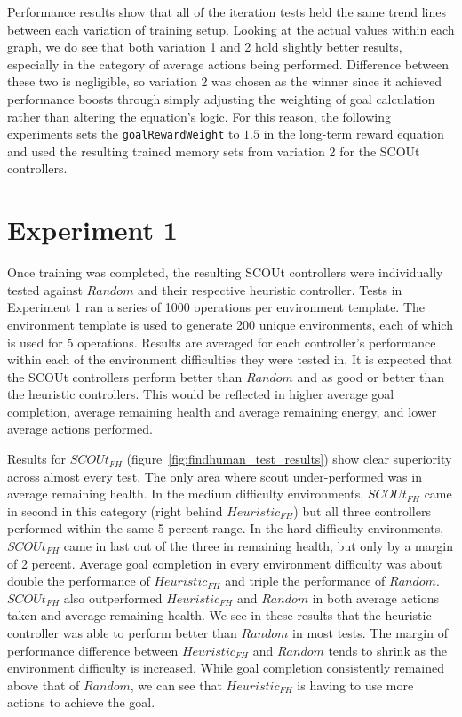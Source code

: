 Performance results show that all of the iteration tests held the same trend lines between each variation of training setup.
Looking at the actual values within each graph, we do see that both variation 1 and 2 hold slightly better results, especially in the category of average actions being performed.
Difference between these two is negligible, so variation 2 was chosen as the winner since it achieved performance boosts through simply adjusting the weighting of goal calculation rather than altering the equation's logic.
For this reason, the following experiments sets the \texttt{goalRewardWeight} to $1.5$ in the long-term reward equation and used the resulting trained memory sets from variation 2 for the SCOUt controllers.



\section{Experiment 1} \label{sec:experiment1}
Once training was completed, the resulting SCOUt controllers were individually tested against $Random$ and their respective heuristic controller.
Tests in Experiment 1 ran a series of 1000 operations per environment template.
The environment template is used to generate 200 unique environments, each of which is used for 5 operations.
Results are averaged for each controller's performance within each of the environment difficulties they were tested in.
It is expected that the SCOUt controllers perform better than $Random$ and as good or better than the heuristic controllers.
This would be reflected in higher average goal completion, average remaining health and average remaining energy, and lower average actions performed.

Results for $SCOUt_{FH}$ (figure~\ref{fig:findhuman_test_results}) show clear superiority across almost every test.
The only area where scout under-performed was in average remaining health.
In the medium difficulty environments, $SCOUt_{FH}$ came in second in this category (right behind $Heuristic_{FH}$) but all three controllers performed within the same 5 percent range.
In the hard difficulty environments, $SCOUt_{FH}$ came in last out of the three in remaining health, but only by a margin of 2 percent.
Average goal completion in every environment difficulty was about double the performance of $Heuristic_{FH}$ and triple the performance of $Random$.
$SCOUt_{FH}$ also outperformed $Heuristic_{FH}$ and $Random$ in both average actions taken and average remaining health.
We see in these results that the heuristic controller was able to perform better than $Random$ in most tests.
The margin of performance difference between $Heuristic_{FH}$ and $Random$ tends to shrink as the environment difficulty is increased.
While goal completion consistently remained above that of $Random$, we can see that $Heuristic_{FH}$ is having to use more actions to achieve the goal.

